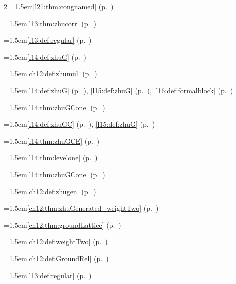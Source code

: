 \begin{multicols}{2}
\hangindent=1.5em\quad \ref{l21:thm:congnamed} (p.~\pageref{l21:thm:congnamed})\par
\hangindent=1.5em\quad \ref{l13:thm:zhucorr} (p.~\pageref{l13:thm:zhucorr})\par
\hangindent=1.5em\quad \ref{l13:def:regular} (p.~\pageref{l13:def:regular})\par
\hangindent=1.5em\quad \ref{l14:def:zhuG} (p.~\pageref{l14:def:zhuG})\par
\hangindent=1.5em\quad \ref{ch12:def:zhumul} (p.~\pageref{ch12:def:zhumul})\par
\hangindent=1.5em\quad \ref{l14:def:zhuG} (p.~\pageref{l14:def:zhuG}), \ref{l15:def:zhuG} (p.~\pageref{l15:def:zhuG}), \ref{l16:def:formalblock} (p.~\pageref{l16:def:formalblock})\par
\hangindent=1.5em\quad \ref{l14:thm:zhuGCone} (p.~\pageref{l14:thm:zhuGCone})\par
\hangindent=1.5em\quad \ref{l14:def:zhuGC} (p.~\pageref{l14:def:zhuGC}), \ref{l15:def:zhuG} (p.~\pageref{l15:def:zhuG})\par
\hangindent=1.5em\quad \ref{l14:thm:zhuGCE} (p.~\pageref{l14:thm:zhuGCE})\par
\hangindent=1.5em\quad \ref{l14:thm:levelone} (p.~\pageref{l14:thm:levelone})\par
\hangindent=1.5em\quad \ref{l14:thm:zhuGCone} (p.~\pageref{l14:thm:zhuGCone})\par
\hangindent=1.5em\quad \ref{ch12:def:zhugen} (p.~\pageref{ch12:def:zhugen})\par
\hangindent=1.5em\quad \ref{ch12:thm:zhuGenerated_weightTwo} (p.~\pageref{ch12:thm:zhuGenerated_weightTwo})\par
\hangindent=1.5em\quad \ref{ch12:thm:groundLattice} (p.~\pageref{ch12:thm:groundLattice})\par
\hangindent=1.5em\quad \ref{ch12:def:weightTwo} (p.~\pageref{ch12:def:weightTwo})\par
\hangindent=1.5em\quad \ref{ch12:def:GroundRel} (p.~\pageref{ch12:def:GroundRel})\par
\hangindent=1.5em\quad \ref{l13:def:regular} (p.~\pageref{l13:def:regular})\par

\end{multicols}
